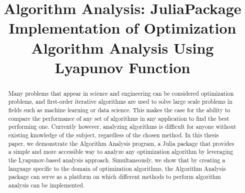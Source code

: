 \documentclass{thesis}
\title{Algorithm Analysis: Julia\texttrademark Package Implementation of Optimization Algorithm Analysis Using Lyapunov Function}
\theoremstyle{definition}
\begin{document}
\frontmatter

\maketitle

\begin{abstract}
  Many problems that appear in science and engineering can be considered optimization problems, and first-order iterative algorithms are used to solve large scale problems in fields such as machine learning or data science. This makes the case for the ability to compare the performance of any set of algorithms in any application to find the best performing one. Currently however, analyzing algorithms is difficult for anyone without existing knowledge of the subject, regardless of the chosen method. In this thesis paper, we demonstrate the Algorithm Analysis program, a Julia package that provides a simple and more accessible way to analyze any optimization algorithm by leveraging the Lyapunov-based analysis approach. Simultaneously, we show that by creating a language specific to the domain of optimization algorithms, the Algorithm Analysis package can serve as a platform on which different methods to perform algorithm analysis can be implemented.
\end{abstract}

\setcounter{page}{3}

\tableofcontents

\lof







\mainmatter






\end{document}
